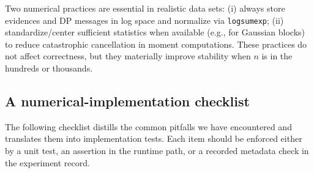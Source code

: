Two numerical practices are essential in realistic data sets:
(i) always store evidences and DP messages in log space and normalize via \texttt{logsumexp};
(ii) standardize/center sufficient statistics when available (e.g., for Gaussian blocks) to
reduce catastrophic cancellation in moment computations.
These practices do not affect correctness, but they materially improve stability when $n$ is
in the hundreds or thousands.

\subsection{A numerical-implementation checklist}
\label{sec:alg-checklist}

The following checklist distills the common pitfalls we have encountered and translates them into
implementation tests. Each item should be enforced either by a unit test, an assertion in the
runtime path, or a recorded metadata check in the experiment record.

